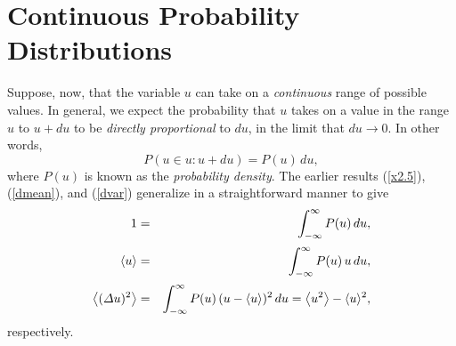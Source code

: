 \section{Continuous Probability Distributions}
Suppose, now, that the variable $u$ can take on a {\em continuous}\/ range of possible
values. In general, we expect the probability that $u$ takes on a value
in the range $u$ to $u+du$ to be {\em directly proportional}\/ to $du$,
in the limit that $du\rightarrow 0$. In other words,
\begin{equation}
P(u\in u:u+du) = P(u)\,du,
\end{equation}
where $P(u)$ is known as the {\em probability density}. 
The earlier results (\ref{x2.5}), (\ref{dmean}), and (\ref{dvar}) generalize in a
straightforward manner to give
\begin{eqnarray}
1&=& \int_{-\infty}^\infty P(u)\,du,\\[0.5ex]
\langle u\rangle &=& \int_{-\infty}^\infty P(u)\,u\,du,\\[0.5ex]
\left\langle({\mit\Delta} u)^2\right\rangle &=& \int_{-\infty}^\infty P(u)\, (u-\langle u\rangle)^2\,du = \left\langle u^2\right\rangle-\langle u\rangle^2,
\end{eqnarray}
respectively.


